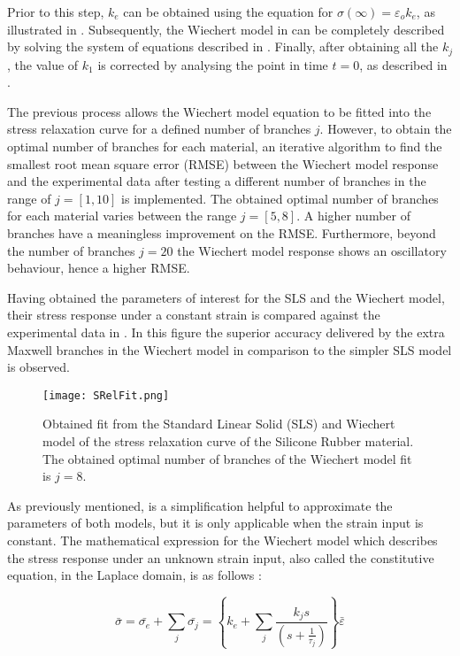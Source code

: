 Prior to this step, $k_e$ can be obtained using the equation for $\sigma(\infty)=\varepsilon_o k_e$, as illustrated in . Subsequently, the Wiechert model in  can be completely described by solving the system of equations described in . Finally, after obtaining all the $k_j$, the value of $k_1$ is corrected by analysing the point in time $t=0$, as described in \cite{roylance2001engineering}. 

The previous process allows the Wiechert model equation to be fitted into the stress relaxation curve for a defined number of branches $j$. However, to obtain the optimal number of branches for each material, an iterative algorithm to find the smallest root mean square error (RMSE) between the Wiechert model response and the experimental data after testing a different number of branches in the range of $j=[1,10]$ is implemented. The obtained optimal number of branches for each material varies between the range $j=[5,8]$. A higher number of branches have a meaningless improvement on the RMSE. Furthermore, beyond the number of branches $j=20$ the Wiechert model response shows an oscillatory behaviour, hence a higher RMSE. 

Having obtained the parameters of interest for the SLS and the Wiechert model, their stress response under a constant strain is compared against the experimental data in . In this figure the superior accuracy delivered by the extra Maxwell branches in the Wiechert model in comparison to the simpler SLS model is observed. 

\begin{figure}[htb!]
	\centering
	\texttt{[image: SRelFit.png]}
	\caption{Obtained fit from the Standard Linear Solid (SLS) and Wiechert model of the stress relaxation curve of the Silicone Rubber material. The obtained optimal number of branches of the Wiechert model fit is $j=8$.}
	\label{fig:StressRelFit}
\end{figure}

As previously mentioned,  is a simplification helpful to approximate the parameters of both models, but it is only applicable when the strain input is constant. The mathematical expression for the Wiechert model which describes the stress response under an unknown strain input, also called the constitutive equation, in the Laplace domain, is as follows \cite{roylance2001engineering}:

\begin{equation}
\label{eq13}
\bar{\sigma} = \bar{\sigma_e} + \sum_j \bar{\sigma_j} = \left\{ k_e + \sum_j \frac{k_j s}{ \left(s + \frac{1}{\tau_j} \right) } \right\} \bar{\varepsilon}
\end{equation}

